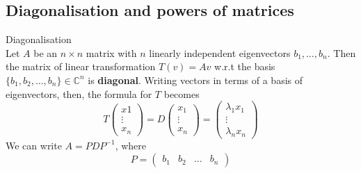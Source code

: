 \documentclass[journal, letterpaper]{IEEEtran}
\begin{document}
    \subsection{Diagonalisation and powers of matrices}
    \begin{mybox}{Diagonalisation} \\
        Let $A$ be an $n \times n$ matrix with $n$ linearly independent eigenvectors $b_1, \dots, b_n$. Then the matrix of linear transformation $T(v) = Av$ w.r.t the basis $\{b_1, b_2, \dots, b_n \} \in \mathbb{C}^n$ is \textbf{diagonal}. Writing vectors in terms of a basis of eigenvectors, then, the formula for $T$ becomes $$T\begin{pmatrix}
            x1 \\ \vdots \\ x_n
        \end{pmatrix} = D\begin{pmatrix}
            x_1 \\ \vdots \\ x_n
        \end{pmatrix} = \begin{pmatrix}
            \lambda_1x_1 \\ \vdots \\ \lambda_nx_n
        \end{pmatrix}
        $$
        We can write $A = PDP^{-1}$, where $$P = \begin{pmatrix}
            b_1 & b_2 & \dots & b_n
        \end{pmatrix}$$
    \end{mybox}
\end{document}
